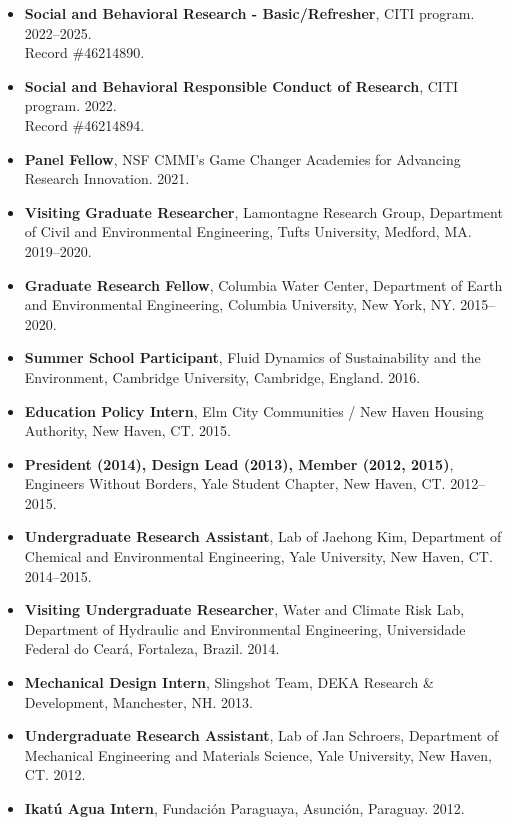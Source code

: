\documentclass[10pt,oneside]{article}
\begin{document}
\begin{itemize}[label={}]

  \item \textbf{Social and Behavioral Research - Basic/Refresher}, CITI program. 2022--2025.\\Record \#46214890.

  \item \textbf{Social and Behavioral Responsible Conduct of Research}, CITI program. 2022.\\Record \#46214894.

  \item \textbf{Panel Fellow}, NSF CMMI's Game Changer Academies for Advancing Research Innovation. 2021.

  \item \textbf{Visiting Graduate Researcher}, Lamontagne Research Group, Department of Civil and Environmental Engineering, Tufts University, Medford, MA. 2019--2020.

  \item \textbf{Graduate Research Fellow}, Columbia Water Center, Department of Earth and Environmental Engineering, Columbia University, New York, NY. 2015--2020.

  \item \textbf{Summer School Participant}, Fluid Dynamics of Sustainability and the Environment, Cambridge University, Cambridge, England. 2016.

  \item \textbf{Education Policy Intern}, Elm City Communities / New Haven Housing Authority, New Haven, CT. 2015.

  \item \textbf{President (2014), Design Lead (2013), Member (2012, 2015)}, Engineers Without Borders, Yale Student Chapter, New Haven, CT. 2012--2015.

  \item \textbf{Undergraduate Research Assistant}, Lab of Jaehong Kim, Department of Chemical and Environmental Engineering, Yale University, New Haven, CT. 2014--2015.

  \item \textbf{Visiting Undergraduate Researcher}, Water and Climate Risk Lab, Department of Hydraulic and Environmental Engineering, Universidade Federal do Ceará, Fortaleza, Brazil. 2014.

  \item \textbf{Mechanical Design Intern}, Slingshot Team, DEKA Research \& Development, Manchester, NH. 2013.

  \item \textbf{Undergraduate Research Assistant}, Lab of Jan Schroers, Department of Mechanical Engineering and Materials Science, Yale University, New Haven, CT. 2012.

  \item \textbf{Ikatú Agua Intern}, Fundación Paraguaya, Asunción, Paraguay. 2012.

\end{itemize}
\end{document}
